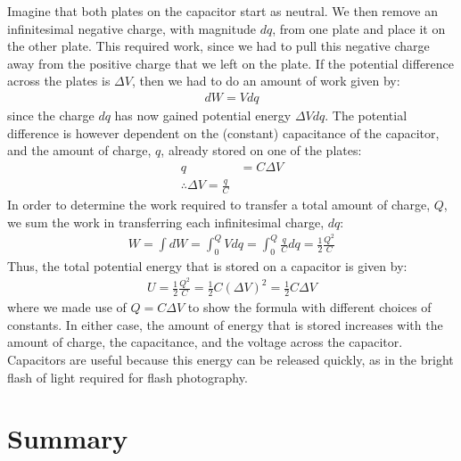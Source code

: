 Imagine that both plates on the capacitor start as neutral. We then remove an infinitesimal negative charge, with magnitude $dq$, from one plate and place it on the other plate. This required work, since we had to pull this negative charge away from the positive charge that we left on the plate. If the potential difference across the plates is $\Delta V$, then we had to do an amount of work given by:
\begin{align*}
dW = Vdq
\end{align*}
since the charge $dq$ has now gained potential energy $\Delta Vdq$. The potential difference is however dependent on the (constant) capacitance of the capacitor, and the amount of charge, $q$, already stored on one of the plates:
\begin{align*}
q &= C\Delta V\\
\therefore \Delta V=\frac{q}{C}
\end{align*}
In order to determine the work required to transfer a total amount of charge, $Q$, we sum the work in transferring each infinitesimal charge, $dq$:
\begin{align*}
W=\int dW=\int_0^Q Vdq=\int_0^Q \frac{q}{C}dq=\frac{1}{2}\frac{Q^2}{C}
\end{align*}
Thus, the total potential energy that is stored on a capacitor is given by:
\begin{align*}
U = \frac{1}{2}\frac{Q^2}{C} = \frac{1}{2}C(\Delta V)^2=\frac{1}{2}C\Delta V
\end{align*}
where we made use of $Q=C\Delta V$ to show the formula with different choices of constants. In either case, the amount of energy that is stored increases with the amount of charge, the capacitance, and the voltage across the capacitor. Capacitors are useful because this energy can be released quickly, as in the bright flash of light required for flash photography.

\newpage
\section{Summary}

